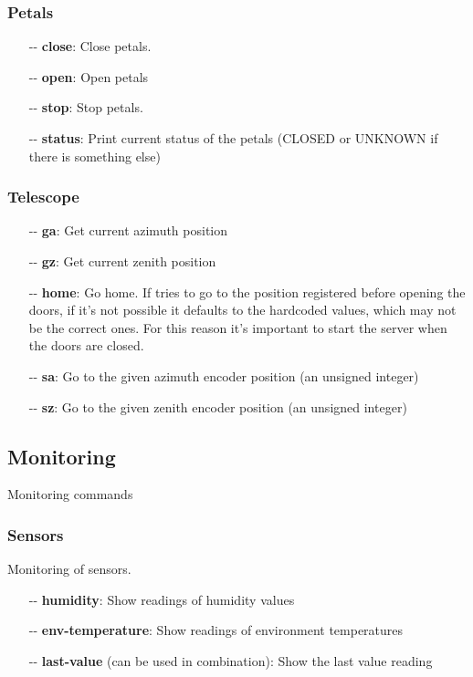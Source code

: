 \documentclass[letterpaper, 10 pt]{article}
\begin{document}
\subsubsection{Petals}
\begin{itemize}
	\item[-{}-] \textbf{close}: Close petals.
	\item[-{}-] \textbf{open}: Open petals
	\item[-{}-] \textbf{stop}: Stop petals. 
	\item[-{}-] \textbf{status}: Print current status of the petals (CLOSED or UNKNOWN if there is something else)
\end{itemize}
\subsubsection{Telescope}
\begin{itemize}
	\item[-{}-] \textbf{ga}: Get current azimuth position
	\item[-{}-] \textbf{gz}: Get current zenith position
	\item[-{}-] \textbf{home}: Go home. If tries to go to the position registered before opening the doors, if it's not possible it defaults to the hardcoded values, which may not be the correct ones. For this reason it's important to start the server when the doors are closed.
	\item[-{}-] \textbf{sa}: Go to the given azimuth encoder position (an unsigned integer)
	\item[-{}-] \textbf{sz}: Go to the given zenith encoder position (an unsigned integer)
\end{itemize}
\subsection{Monitoring}
Monitoring commands
\subsubsection{Sensors}
Monitoring of sensors. 
\begin{itemize}
	\item[-{}-] \textbf{humidity}: Show readings of humidity values 
	\item[-{}-] \textbf{env-temperature}: Show readings of environment temperatures
	\item[-{}-] \textbf{last-value} (can be used in combination): Show the last value reading
\end{itemize}
\end{document}
